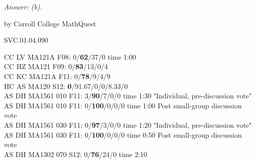 {\it Answer: (b).} 

\medskip
by Carroll College MathQuest

SVC.01.04.090


CC LV MA121A F08: 0/{\bf62}/37/0 time 1:00\\
CC HZ MA121 F09: 0/{\bf83}/13/0/4  \\
CC KC MA121A F11: 0/{\bf78}/9/4/9  \\
HC AS MA120 S12: {\bf 0}/91.67/0/0/8.33/0  \\
AS DH MA1561 010 F11: 3/{\bf90}/7/0/0 time 1:30 "Individual, pre-discussion vote" \\
AS DH MA1561 010 F11: 0/{\bf100}/0/0/0 time 1:00 Post small-group discussion vote \\
AS DH MA1561 030 F11: 0/{\bf97}/3/0/0 time 1:20 "Individual, pre-discussion vote" \\
AS DH MA1561 030 F11: 0/{\bf100}/0/0/0 time 0:50 Post small-group discussion vote \\
AS DH MA1302 070 S12: 0/{\bf76}/24/0 time 2:10  \\
